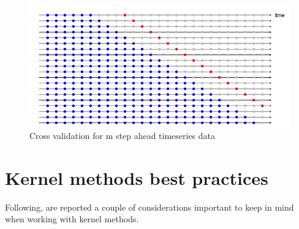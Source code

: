 \begin{figure}
    \includegraphics[width=\textwidth]{images/crossvalidationtimeseries2.png}
    \caption{Cross validation for m step ahead timeseries data \cite{hyndman2018forecasting}}
    \label{fig:crossvalidationtimeseries2}
\end{figure}

\section{Kernel methods best practices}
Following, are reported a couple of considerations important to keep in mind when working with kernel methods.

